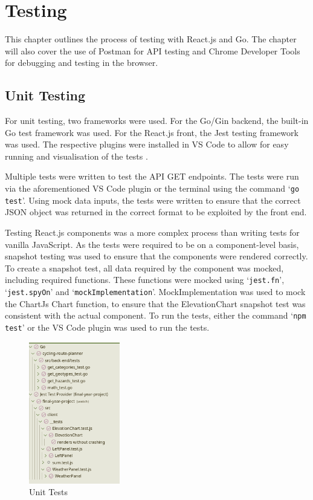 \chapter{Testing}
\label{chap:testing}

This chapter outlines the process of testing with React.js and Go. The chapter will also cover the use of Postman for API testing and Chrome Developer Tools for debugging and testing in the browser.

\section{Unit Testing}
\label{testing:unit}

For unit testing, two frameworks were used. For the Go/Gin backend, the built-in Go test framework was used. For the React.js front, the Jest testing framework was used. The respective plugins were installed in VS Code to allow for easy running and visualisation of the tests .

Multiple tests were written to test the API GET endpoints. The tests were run via the aforementioned VS Code plugin or the terminal using the command `\texttt{go test}'. Using mock data inputs, the tests were written to ensure that the correct JSON object was returned in the correct format to be exploited by the front end.

Testing React.js components was a more complex process than writing tests for vanilla JavaScript. As the tests were required to be on a component-level basis, snapshot testing was used to ensure that the components were rendered correctly. To create a snapshot test, all data required by the component was mocked, including required functions. These functions were mocked using `\texttt{jest.fn}', `\texttt{jest.spyOn}' and `\texttt{mockImplementation}'. MockImplementation was used to mock the ChartJs Chart function, to ensure that the ElevationChart snapshot test was consistent with the actual component. To run the tests, either the command `\texttt{npm test}' or the VS Code plugin was used to run the tests.

\begin{figure}[!ht]
    \centering
    \includegraphics[width=150px]{figures/unit-tests.png}
    \caption{Unit Tests}
    \label{fig:unit-tests}
  \end{figure}

